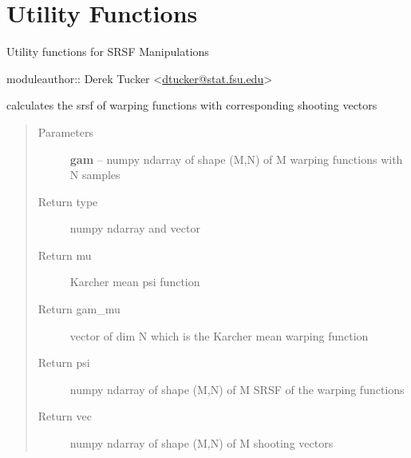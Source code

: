 \documentclass[letterpaper,10pt,english]{sphinxmanual}
\begin{document}
\chapter{Utility Functions}
\label{utility_functions:module-utility_functions}\label{utility_functions::doc}\label{utility_functions:utility-functions}
Utility functions for SRSF Manipulations

moduleauthor:: Derek Tucker \textless{}\href{mailto:dtucker@stat.fsu.edu}{dtucker@stat.fsu.edu}\textgreater{}

\begin{fulllineitems}
\label{utility_functions:utility_functions.SqrtMean}
calculates the srsf of warping functions with corresponding shooting vectors
\begin{quote}\begin{description}
\item[{Parameters}] \leavevmode
\textbf{gam} -- numpy ndarray of shape (M,N) of M warping functions with N samples

\item[{Return type}]  numpy ndarray and vector

\item[{Return mu}] \leavevmode
Karcher mean psi function

\item[{Return gam\_mu}] \leavevmode
vector of dim N which is the Karcher mean warping function

\item[{Return psi}] \leavevmode
numpy ndarray of shape (M,N) of M SRSF of the warping functions

\item[{Return vec}] \leavevmode
numpy ndarray of shape (M,N) of M shooting vectors

\end{description}\end{quote}

\end{fulllineitems}

\end{document}
